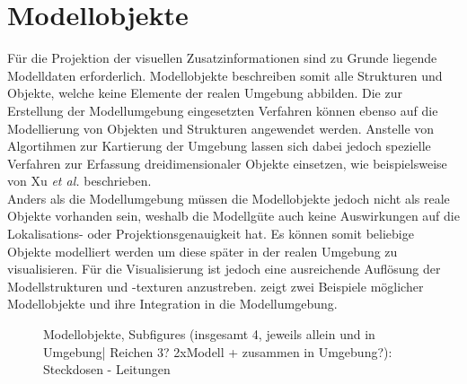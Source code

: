 \section{Modellobjekte}
Für die Projektion der visuellen Zusatzinformationen sind zu Grunde liegende Modelldaten erforderlich. Modellobjekte beschreiben somit alle Strukturen und Objekte, welche keine Elemente der realen Umgebung abbilden. Die zur Erstellung der Modellumgebung eingesetzten Verfahren können ebenso auf die Modellierung von Objekten und Strukturen angewendet werden. Anstelle von Algortihmen zur Kartierung der Umgebung lassen sich dabei jedoch spezielle Verfahren zur Erfassung dreidimensionaler Objekte einsetzen, wie beispielsweise von Xu \textit{et al.} \cite{Xu2012} beschrieben.\\

Anders als die Modellumgebung müssen die Modellobjekte jedoch nicht als reale Objekte vorhanden sein, weshalb die Modellgüte auch keine Auswirkungen auf die Lokalisations- oder Projektionsgenauigkeit hat. Es können somit beliebige Objekte modelliert werden um diese später in der realen Umgebung zu visualisieren.  Für die Visualisierung ist jedoch eine ausreichende Auflösung der Modellstrukturen und -texturen anzustreben.  zeigt zwei Beispiele möglicher Modellobjekte und ihre Integration in die Modellumgebung.\\

\begin{figure}[ht]
	\begin{center}
	\hspace{3mm}
	\caption{Modellobjekte, Subfigures (insgesamt 4, jeweils allein und in Umgebung| Reichen 3? 2xModell + zusammen in Umgebung?): Steckdosen - Leitungen}
	\label{fig.modobj}
	\end{center}
\end{figure}


